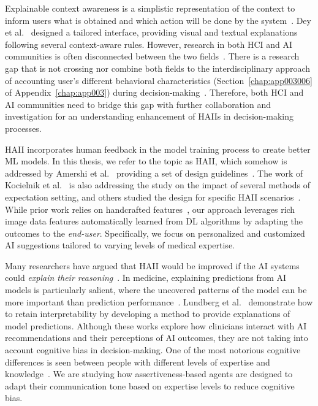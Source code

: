 Explainable context awareness is a simplistic representation of the context to inform users what is obtained and which action will be done by the system~\cite{10.1145/3313831.3376545}.
Dey et al.~\cite{10.1145/1518701.1518832} designed a tailored interface, providing visual and textual explanations following several context-aware rules.
However, research in both \ac{HCI} and \ac{AI} communities is often disconnected between the two fields~\cite{10.1145/3173574.3174156, 10.1145/3313831.3376807}.
There is a research gap that is not crossing nor combine both fields to the interdisciplinary approach of accounting user's different behavioral characteristics (Section~\ref{chap:app003006} of Appendix~\ref{chap:app003}) during decision-making~\cite{10.1145/3173574.3174156}.
Therefore, both \ac{HCI} and \ac{AI} communities need to bridge this gap with further collaboration and investigation for an understanding enhancement of \acp{HAII} in decision-making processes.

\ac{HAII} incorporates human feedback in the model training process to create better \ac{ML} models.
In this thesis, we refer to the topic as \ac{HAII}, which somehow is addressed by Amershi et al.~\cite{10.1145/3290605.3300233} providing a set of design guidelines~\cite{10.1145/3132272.3134111}.
The work of Kocielnik et al.~\cite{Kocielnik:2019:YAI:3290605.3300641} is also addressing the study on the impact of several methods of expectation setting, and others studied the design for specific \ac{HAII} scenarios~\cite{aha2017ai}.
While prior work relies on handcrafted features~\cite{10.1145/3290605.3300233, Kocielnik:2019:YAI:3290605.3300641}, our approach leverages rich image data features automatically learned from \ac{DL} algorithms by adapting the outcomes to the {\it end-user}.
Specifically, we focus on personalized and customized \ac{AI} suggestions tailored to varying levels of medical expertise.

Many researchers have argued that \ac{HAII} would be improved if the \ac{AI} systems could {\it explain their reasoning}~\cite{10.1145/3411764.3445717, Rudin2022, Kawamleh2022}.
In medicine, explaining predictions from \ac{AI} models is particularly salient, where the uncovered patterns of the model can be more important than prediction performance~\cite{Lundberg2020}.
Lundberg et al.~\cite{Lundberg2018} demonstrate how to retain interpretability by developing a method to provide explanations of model predictions.
Although these works explore how clinicians interact with \ac{AI} recommendations and their perceptions of \ac{AI} outcomes, they are not taking into account cognitive bias in decision-making.
One of the most notorious cognitive differences is seen between people with different levels of expertise and knowledge~\cite{https://doi.org/10.1111/nuf.12430, Seidel2021}.
We are studying how assertiveness-based agents are designed to adapt their communication tone based on expertise levels to reduce cognitive bias.

